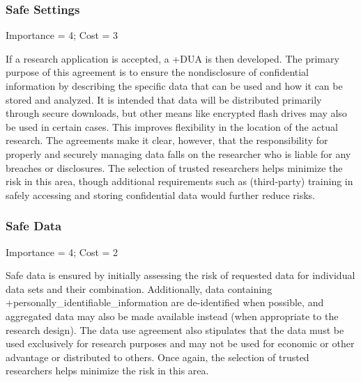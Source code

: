 \documentclass[
]{WileySix}
\begin{document}
\hypertarget{safe-settings-6}{%
\subsubsection{Safe Settings}\label{safe-settings-6}}

Importance = 4; Cost = 3

If a research application is accepted, a +DUA\textbar{} is then developed. The primary purpose of this agreement is to ensure the nondisclosure of confidential information by describing the specific data that can be used and how it can be stored and analyzed. It is intended that data will be distributed primarily through secure downloads, but other means like encrypted flash drives may also be used in certain cases. This improves flexibility in the location of the actual research. The agreements make it clear, however, that the responsibility for properly and securely managing data falls on the researcher who is liable for any breaches or disclosures. The selection of trusted researchers helps minimize the risk in this area, though additional requirements such as (third-party) training in safely accessing and storing confidential data would further reduce risks.

\hypertarget{safe-data-6}{%
\subsubsection{Safe Data}\label{safe-data-6}}

Importance = 4; Cost = 2

Safe data is ensured by initially assessing the risk of requested data for individual data sets and their combination. Additionally, data containing +personally\_identifiable\_information\textbar{} are de-identified when possible, and aggregated data may also be made available instead (when appropriate to the research design). The data use agreement also stipulates that the data must be used exclusively for research purposes and may not be used for economic or other advantage or distributed to others. Once again, the selection of trusted researchers helps minimize the risk in this area.
\end{document}
